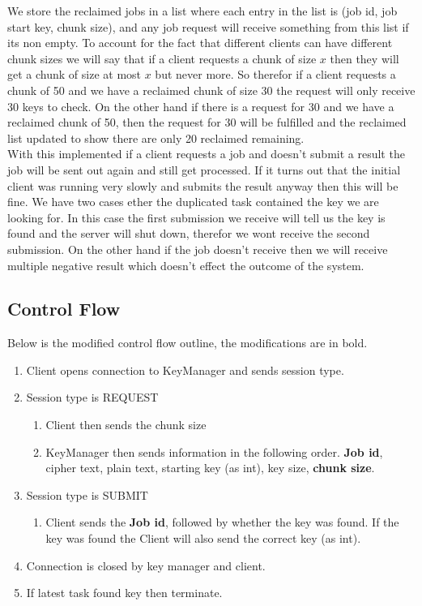\documentclass[a4paper, 12pt]{article}
\begin{document}
		We store the reclaimed jobs in a list where each entry in the list is (job id, job start key, chunk size), and any job request will receive something from this list if its non empty. To account for the fact that different clients can have different chunk sizes we will say that if a client requests a chunk of size $x$ then they will get a chunk of size at most $x$ but never more. So therefor if a client requests a chunk of 50 and we have a reclaimed chunk of size 30 the request will only receive 30 keys to check. On the other hand if there is a request for 30 and we have a reclaimed chunk of 50, then the request for 30 will be fulfilled and the reclaimed list updated to show there are only 20 reclaimed remaining.\\
		
		
		With this implemented if a client requests a job and doesn't submit a result the job will be sent out again and still get processed. If it turns out that the initial client was running very slowly and submits the result anyway then this will be fine. We have two cases ether the duplicated task contained the key we are looking for. In this case the first submission we receive will tell us the key is found and the server will shut down, therefor we wont receive the second submission. On the other hand if the job doesn't receive then we will receive multiple negative result which doesn't effect the outcome of the system.
		
		\subsection{Control Flow}	
			Below is the modified control flow outline, the modifications are in bold.		
		
			\begin{enumerate}
  				\item Client opens connection to KeyManager and sends session type.
  				\item Session type is REQUEST
  					\begin{enumerate}
  						\item Client then sends the chunk size
  						\item KeyManager then sends information in the following order. \textbf{Job id}, cipher text, plain text, starting key (as int), key size, \textbf{chunk size}.
  					\end{enumerate}
  			
				\item Session type is SUBMIT
  					\begin{enumerate}
  						\item Client sends the \textbf{Job id}, followed by whether the key was found. If the key was found the Client will also send the correct key (as int).
  					\end{enumerate}  			
  				\item Connection is closed by key manager and client.
  				\item If latest task found key then terminate.
  			\end{enumerate}
  			
\end{document}
